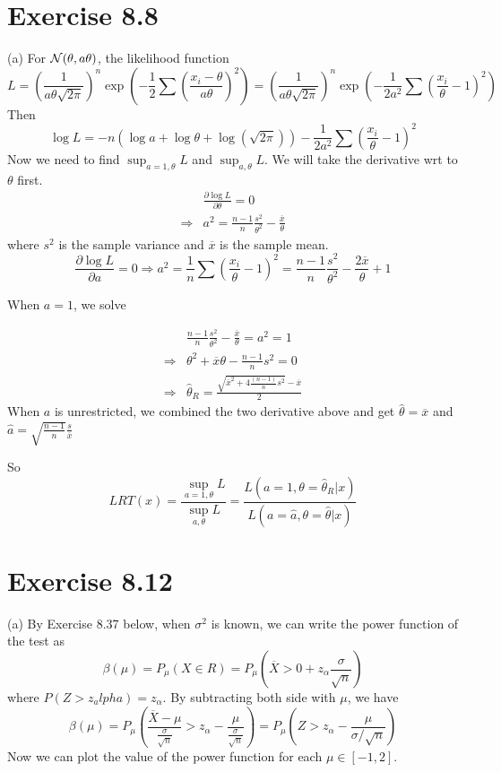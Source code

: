\documentclass[12pt]{article}
\begin{document}
\section*{Exercise 8.8}
(a)
For $\mathcal{N}(\theta, a\theta)$, the likelihood function $$L = \left(\frac{1}{a\theta \sqrt{2\pi}}\right)^n \exp(-\frac{1}{2} \sum \left(\frac{x_i - \theta}{a\theta}\right)^2) = \left(\frac{1}{a\theta \sqrt{2\pi}}\right)^n \exp(-\frac{1}{2a^2} \sum \left(\frac{x_i}{\theta} - 1\right)^2)$$
Then $$\log L = -n (\log a + \log \theta + \log(\sqrt{2\pi})) - \frac{1}{2a^2} \sum \left(\frac{x_i}{\theta} - 1\right)^2$$
Now we need to find $\sup_{a=1, \theta} L$ and $\sup_{a,\theta} L$. We will take the derivative wrt to $\theta$ first.
\begin{align*}
	&\frac{\partial \log L}{\partial \theta} = 0 \\
	\Rightarrow & a^2  = \frac{n-1}{n} \frac{s^2}{\theta^2} - \frac{\overline{x}}{\theta}
\end{align*}
where $s^2$ is the sample variance and $\overline{x}$ is the sample mean.
$$ \frac{\partial \log L}{\partial a} = 0 \Rightarrow a^2 = \frac{1}{n} \sum \left(\frac{x_i}{\theta} - 1 \right)^2  = \frac{n-1}{n} \frac{s^2}{\theta^2} - \frac{2 \overline{x}}{\theta} + 1$$

When $a = 1$, we solve

\begin{align*}
	&\frac{n-1}{n} \frac{s^2}{\theta^2} - \frac{\overline{x}}{\theta} = a^2 = 1 \\
	\Rightarrow & \theta^2 + \overline{x} \theta - \frac{n-1}{n}s^2 = 0 \\
	\Rightarrow & \hat{\theta}_R = \frac{\sqrt{\overline{x}^2 + 4\frac{(n-1)}{n}s^2} - \overline{x}}{2}
\end{align*}
When $a$ is unrestricted, we combined the two derivative above and get $\hat{\theta} = \overline{x}$ and $\hat{a} = \sqrt{\frac{n-1}{n}} \frac{s}{\overline{x}}$

So $$LRT(x) = \frac{\sup_{a=1, \theta} L}{\sup_{a,\theta} L} = \frac{L(a=1, \theta=\hat{\theta}_R| x ) }{L(a = \hat{a}, \theta=\hat{\theta} | x)}$$

\section*{Exercise 8.12}
(a) By Exercise 8.37 below, when $\sigma^2$ is known, we can write the power function of the test as 
$$ \beta(\mu) = P_\mu(X \in R) = P_\mu(\overline{X} > 0 + z_\alpha \frac{\sigma}{\sqrt{n}}) $$
where $P(Z > z_alpha) = z_\alpha$. By subtracting both side with $\mu$, we have 
$$ \beta(\mu) =  P_\mu( \frac{\overline{X} - \mu}{ \frac{\sigma}{\sqrt{n}}} > z_\alpha - \frac{\mu}{ \frac{\sigma}{\sqrt{n}}}) = P_\mu(Z > z_\alpha - \frac{\mu}{ \sigma / \sqrt{n}})$$
Now we can plot the value of the power function for each $\mu \in [-1, 2]$.
\end{document}
